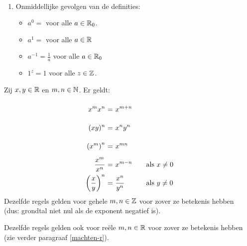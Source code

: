 \documentclass{ximera}
\begin{document}

\begin{remark} \ 
	
	\begin{enumerate}
	\item Onmiddellijke gevolgen van de definities:
			\begin{itemize}
			\item $a^0=$ voor alle $a\in\mathbb{R}_0$.
			\item $a^1=$ voor alle $a\in\mathbb{R}$
			\item $a^{-1}=\frac{1}{a}$ voor alle $a\in\mathbb{R}_0$
			\item $1^z=1$ voor alle $z\in\mathbb{Z}$.
		\end{itemize}
\end{enumerate} 
\end{remark}

\begin{proposition}
	Zij $x,y\in\mathbb{R}$ en $m,n\in\mathbb{N}$. Er geldt:
	\[
	\arraycolsep=1.4pt\def\arraystretch{2.2}
	\begin{array}{r@{\ =\ }l@{\qquad}l}
	\ds{x^{m}x^{n}}&\ds{x^{m+n}}&\\
	\ds{(xy)^n}&\ds{x^ny^n}&\\
	\ds{\left(x^{m}\right)^{n}}&\ds{x^{mn}}&\\
	\ds{\frac{x^{m}}{x^{n}}}&\ds{x^{m-n}}&\textrm{als }x\neq0\\
	\ds{\left(\frac{x}{y}\right)^{n}}&\ds{\frac{x^{n}}{y^{n}}}&\textrm{als }y\neq0\\
	\end{array}
	\]
	Dezelfde regels gelden voor gehele $m,n\in\mathbb{Z}$ voor zover ze betekenis hebben 
	\\ (dus: grondtal niet nul als de exponent negatief is).
	
	Dezelfde regels gelden ook voor reële $m,n\in\mathbb{R}$ voor zover ze betekenis hebben
	\\ (zie verder paragraaf \ref{machten-r}).

\end{proposition}
\end{document}
